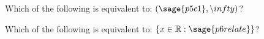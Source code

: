 \documentclass{ximeraXloud}
\begin{document}
\begin{problem}
    Which of the following is equivalent to: $(\sage{p5c1}, \infty)$?
    \begin{multipleChoice}
    \end{multipleChoice}
    
\end{problem}


\begin{problem}
    Which of the following is equivalent to: $\{ x \in \mathbb{R} : \sage{p6relate} \}$?
    \begin{multipleChoice}
    \end{multipleChoice}
\end{problem}
\end{document}
